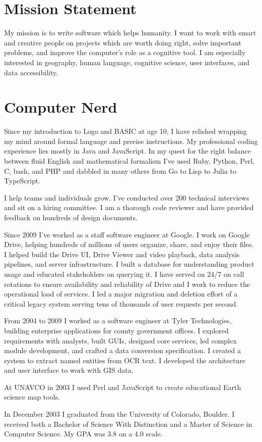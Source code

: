 \section*{Mission Statement}
My mission is to write software which helps humanity.  I want to work with
smart and creative people on projects which are worth doing right,
solve important problems, and improve the computer's role as a cognitive tool.
I am especially interested in geography, human language, cognitive science,
user interfaces, and data accessibility.
\section*{Computer Nerd}
  \begin{compactitem}
  \item Since my introduction to Logo and BASIC at age 10, I have relished
    wrapping my mind around formal language and precise instructions.  My
    professional coding experience lies mostly in Java and JavaScript. In my
    quest for the right balance between fluid English and mathematical formalism
    I've used Ruby, Python, Perl, C, bash, and PHP and dabbled in many others
    from Go to Lisp to Julia to TypeScript.
  \item I help teams and individuals grow.  I've conducted over 200 technical
    interviews and sit on a hiring committee.  I am a thorough code reviewer
    and have provided feedback on hundreds of design documents.
  \item Since 2009 I've worked as a staff software engineer at Google.  I work
    on Google Drive, helping hundreds of millions of users organize, share, and
    enjoy their files.  I helped build the Drive UI, Drive Viewer and video
    playback, data analysis pipelines, and server infrastructure.  I built a
    database for understanding product usage and educated stakeholders on
    querying it.  I have served on 24/7 on call rotations to ensure availability
    and reliability of Drive and I work to reduce the operational load of
    services.  I led a major migration and deletion effort of a critical legacy
    system serving tens of thousands of user requests per second.
  \item From 2004 to 2009 I worked as a software engineer at Tyler Technologies,
    building enterprise applications for county government offices.  I explored
    requirements with analysts, built GUIs, designed core
    services, led complex module development, and crafted a data conversion
    specification.  I created a system to
    extract named entities from OCR text.  I developed the architecture and user
    interface to work with GIS data.
  \item At UNAVCO in 2003 I used Perl and JavaScript to create educational
    Earth science map tools.
  \item In December 2003 I graduated from the University of Colorado, Boulder.
    I received both a Bachelor of Science With Distinction and a Master of
    Science in Computer Science.  My GPA was 3.8 on a 4.0 scale.
  \end{compactitem}
